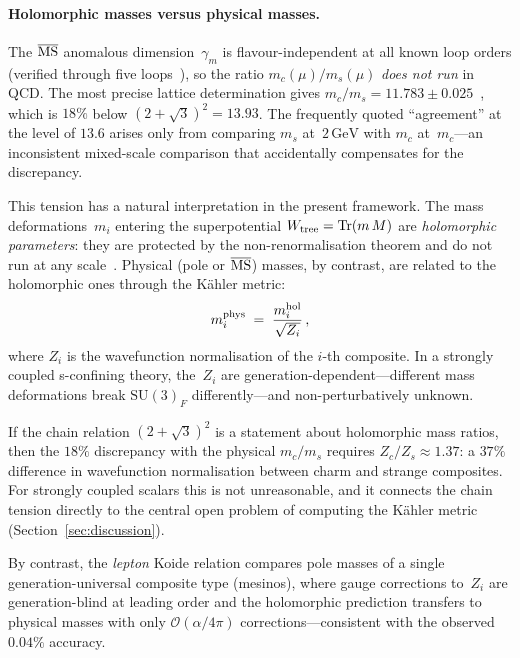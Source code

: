 \documentclass[12pt,a4paper]{article}
\newcommand{\SU}{\mathrm{SU}}
\newcommand{\Tr}{\mathrm{Tr}}
\newcommand{\GeV}{\,\mathrm{GeV}}
\begin{document}
\paragraph{Holomorphic masses versus physical masses.}
The $\overline{\rm MS}$ anomalous dimension~$\gamma_m$ is
flavour-independent at all known loop orders (verified through
five loops~\cite{Baikov:2014qja}), so the ratio
$m_c(\mu)/m_s(\mu)$ \emph{does not run} in QCD\@.
The most precise lattice determination gives
$m_c/m_s = 11.783 \pm 0.025$~\cite{FNAL:2018mc_ms}, which is
$18\%$ below $(2{+}\sqrt{3})^2 = 13.93$.
The frequently quoted ``agreement'' at the level of $13.6$ arises
only from comparing $m_s$ at~$2\GeV$ with $m_c$ at~$m_c$---an
inconsistent mixed-scale comparison that accidentally compensates for
the discrepancy.

This tension has a natural interpretation in the present framework.
The mass deformations~$m_i$ entering the superpotential
$W_{\rm tree} = \Tr(m\,M)$ are \emph{holomorphic parameters}:
they are protected by the non-renormalisation theorem and do not run
at any scale~\cite{Intriligator:1995au,
ArkaniHamedMurayama:1997}.  Physical (pole or $\overline{\rm MS}$)
masses, by contrast, are related to the holomorphic ones through the
K\"ahler metric:
\begin{equation}
  m_i^{\rm phys} \;=\; \frac{m_i^{\rm hol}}{\sqrt{Z_i}}\,,
  \label{eq:kahler_matching}
\end{equation}
where $Z_i$ is the wavefunction normalisation of the $i$-th
composite.  In a strongly coupled s-confining theory, the~$Z_i$
are generation-dependent---different mass deformations break
$\SU(3)_F$ differently---and non-perturbatively unknown.

If the chain relation $(2{+}\sqrt{3})^2$ is a statement about
holomorphic mass ratios, then the $18\%$ discrepancy with the
physical $m_c/m_s$ requires $Z_c/Z_s \approx 1.37$: a $37\%$
difference in wavefunction normalisation between charm and strange
composites.  For strongly coupled scalars this is not unreasonable,
and it connects the chain tension directly to the central open
problem of computing the K\"ahler metric (Section~\ref{sec:discussion}).

By contrast, the \emph{lepton} Koide relation compares pole masses
of a single generation-universal composite type (mesinos), where
gauge corrections to~$Z_i$ are generation-blind at leading order
and the holomorphic prediction transfers to physical masses with
only $\mathcal{O}(\alpha/4\pi)$ corrections---consistent with
the observed $0.04\%$ accuracy.
\end{document}
